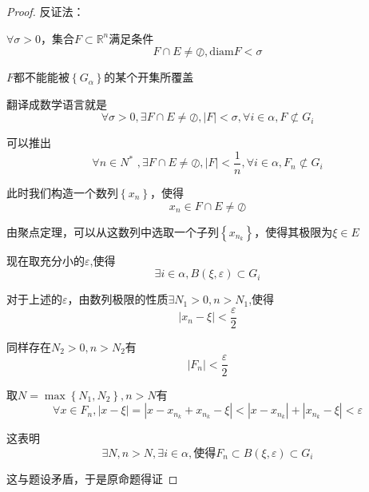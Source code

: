 \documentclass[lang=cn,10pt]{elegantbook}
\begin{document}
\begin{proof}
	反证法：
	
$\forall	\sigma >0$，集合$F\subset\mathbb{R} ^n $满足条件
	\begin{equation*}
		F\cap E\ne \oslash,\mathrm{diam}F<\sigma 
	\end{equation*}
	
	$F$都不能能被$\left\{ G_{\alpha} \right\} $的某个开集所覆盖
	
	翻译成数学语言就是
	\begin{equation*}
		\forall \sigma >0,\exists F\cap E\ne\oslash,|F|<\sigma ,\forall i\in \alpha ,F   \nsubset G_i
	\end{equation*}
	
	可以推出
	\begin{equation*}
		\forall n\in N^*\,\,,\exists F\cap E\ne\oslash,|F|<\frac{1}{n},\forall i\in \alpha ,F_n\nsubset G_i
	\end{equation*}
	
	此时我们构造一个数列$\left\{ x_{n} \right\} $，使得
	\begin{equation*}
		 x_{n} \in F\cap E\ne\oslash
	\end{equation*}
	
	由聚点定理，可以从这数列中选取一个子列$\left\{ x_{n_{k}} \right\} $，使得其极限为$\xi \in E$
	
	现在取充分小的$\varepsilon$,使得
	\begin{equation*}
		\exists i\in \alpha ,B(\xi,\varepsilon)\subset G_{i}
	\end{equation*}
	
	对于上述的$\varepsilon$，由数列极限的性质$\exists N_{1}>0,n>N_{1}$,使得
	\begin{equation*}
	|x_n-\xi |<\frac{\varepsilon }{2}
	\end{equation*}
	
	同样存在$N_{2}>0,n>N_{2}$有
	\begin{equation*}
		|F_{n}|<\frac{\varepsilon}{2}
	\end{equation*}
	
	取$N=\max \left\{ N_1,N_2 \right\} ,n>N$有
	\begin{equation*}
		\forall x \in F_{n},|x-\xi |=|x-x_{n_k}+x_{n_k}-\xi |<|x-x_{n_k}|+|x_{n_k}-\xi |<\varepsilon 
	\end{equation*}
	
	这表明
	\begin{equation*}
		\exists N,n>N,\exists i\in \alpha ,\text{使得}F_n\subset   B(\xi,\varepsilon)\subset G_{i}
	\end{equation*}
	
	这与题设矛盾，于是原命题得证
\end{proof}
\end{document}
